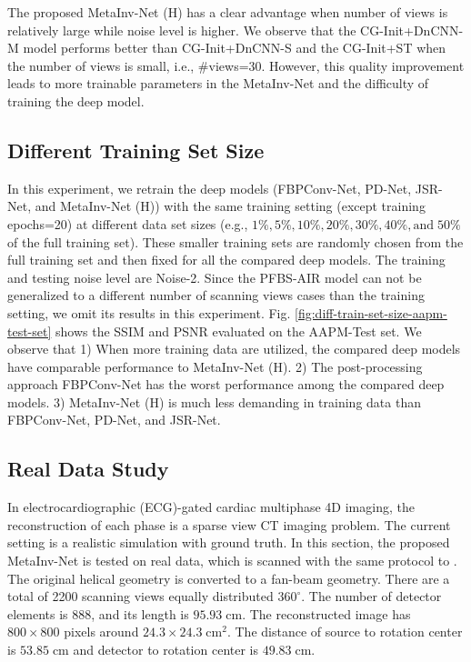 \documentclass[journal,twoside]{IEEEtran}
\begin{document}
The proposed MetaInv-Net (H) has a clear advantage when number of views is relatively large while noise level is higher. We observe that the CG-Init+DnCNN-M model performs better than CG-Init+DnCNN-S and the CG-Init+ST when the number of views is small, i.e., \#views=30. However, this quality improvement leads to more trainable parameters in the MetaInv-Net and the difficulty of training the deep model. 


\subsection{Different Training Set Size}
In this experiment, we retrain the deep models (FBPConv-Net, PD-Net, JSR-Net, and MetaInv-Net (H)) with the same training setting (except training epochs=20) at different data set sizes (e.g., $1\%, 5\%, 10\%, 20\%, 30\%, 40\%, \mbox{and}\; 50\%$  of the full training set). These smaller training sets are randomly chosen from the full training set and then fixed for all the compared deep models. The training and testing noise level are Noise-2. Since the PFBS-AIR model can not be generalized to a different number of scanning views cases than the training setting, we omit its results in this experiment. Fig. \ref{fig:diff-train-set-size-aapm-test-set} shows the SSIM and PSNR evaluated on the AAPM-Test set.  We observe that 1) When more training data are utilized, the compared deep models have comparable performance to MetaInv-Net (H). 2) The post-processing approach FBPConv-Net has the worst performance among the compared deep models. 3) MetaInv-Net (H) is much less demanding in training data than FBPConv-Net, PD-Net, and JSR-Net.


\subsection{Real Data Study}

In electrocardiographic (ECG)-gated cardiac multiphase 4D imaging, the reconstruction of each phase is a sparse view CT imaging problem. The current setting is a realistic simulation with ground truth. In this section, the proposed MetaInv-Net is tested on real data, which is scanned with the same protocol to \cite{hengyongyu-2011}. The original helical geometry is converted to a fan-beam geometry. There are a total of 2200 scanning views equally distributed $360^\circ$. The number of detector elements is 888, and its length is $95.93\; \mbox{cm}$. The reconstructed image has $800\times 800$ pixels around $24.3\times 24.3\; \mbox{cm}^2$. The distance of source to rotation center is $ 53.85\;\mbox{cm}$ and detector to rotation center is $49.83\;\mbox{cm}$. 
\end{document}

